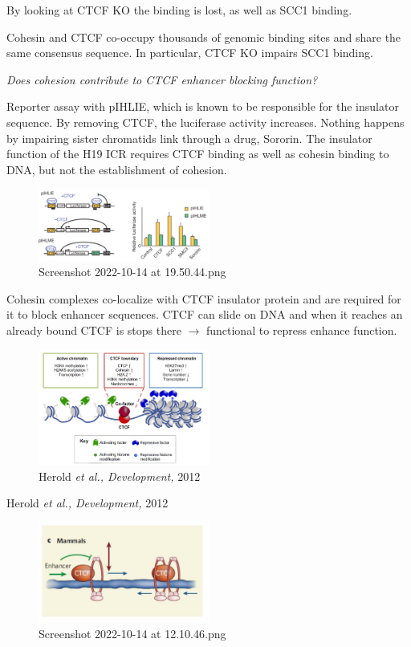 By looking at CTCF KO the binding is lost, as well as SCC1 binding.

Cohesin and CTCF co-occupy thousands of genomic binding sites and share the same consensus sequence. In particular, CTCF KO impairs SCC1 binding.

\emph{Does cohesion contribute to CTCF enhancer blocking function?}

Reporter assay with pIHLIE, which is known to be responsible for the insulator sequence. By removing CTCF, the luciferase activity increases. Nothing happens by impairing sister chromatids link through a drug, Sororin. The insulator function of the H19 ICR requires CTCF binding as well as cohesin binding to DNA, but not the establishment of cohesion.

\begin{figure}
\centering
\includegraphics[width=0.5\textwidth]{../_resources/Screenshot_2022-10-14_at_19-50-44.png}
\caption{Screenshot 2022-10-14 at 19.50.44.png}
\end{figure}

Cohesin complexes co-localize with CTCF insulator protein and are required for it to block enhancer sequences. CTCF can slide on DNA and when it reaches an already bound CTCF is stops there $\rightarrow$ functional to repress enhance function.

\begin{figure}
\centering
\includegraphics[width=0.5\textwidth]{../_resources/Screenshot_2022-10-14_at_12-11-11.png}
\caption{Herold \emph{et al., Development,} 2012}
\end{figure}

Herold \emph{et al., Development,} 2012

\begin{figure}
\centering
\includegraphics[width=0.5\textwidth]{../_resources/Screenshot_2022-10-14_at_12-10-46.png}
\caption{Screenshot 2022-10-14 at 12.10.46.png}
\end{figure}

